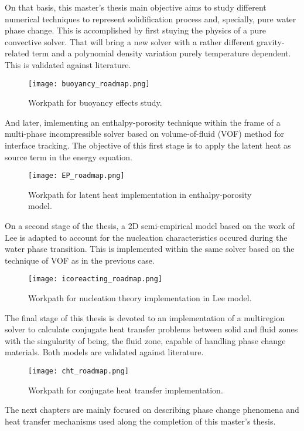 \noindent On that basis, this master's thesis main objective aims to study different numerical techniques to represent solidification process and, specially, pure water phase change. This is accomplished by first stuying the physics of a pure convective solver. That will bring a new solver with a rather different gravity-related term and a polynomial density variation purely temperature dependent. This is validated against literature.
\begin{figure}[h!]
	\centering
	\texttt{[image: buoyancy\_roadmap.png]}
	\caption{Workpath for buoyancy effects study.} 
	\label{1.1fig}
\end{figure}
\clearpage
\noindent And later, imlementing an enthalpy-porosity technique within the frame of a multi-phase incompressible solver based on volume-of-fluid (VOF) method for interface tracking. The objective of this first stage is to apply the latent heat as source term in the energy equation. 
\begin{figure}[h!]
	\centering
	\texttt{[image: EP\_roadmap.png]}
	\caption{Workpath for latent heat implementation in enthalpy-porosity model.} 
	\label{1.2fig}
\end{figure}
\newline
On a second stage of the thesis, a 2D semi-empirical model based on the work of Lee is adapted to account for the nucleation characteristics occured during the water phase transition. This is implemented within the same solver based on the technique of VOF as in the previous case.
\begin{figure}[h!]
	\centering
	\texttt{[image: icoreacting\_roadmap.png]}
	\caption{Workpath for nucleation theory implementation in Lee model.} 
	\label{1.3fig}
\end{figure}
\newline
\noindent The final stage of this thesis is devoted to an implementation of a multiregion solver to calculate conjugate heat transfer problems between solid and fluid zones with the singularity of being, the fluid zone, capable of handling phase change materials. Both models are validated against literature.
\clearpage
\begin{figure}[h!]
	\centering
	\texttt{[image: cht\_roadmap.png]}
	\caption{Workpath for conjugate heat transfer implementation.} 
	\label{1.4fig}
\end{figure}

\noindent The next chapters are mainly focused on describing phase change phenomena and heat transfer mechanisms used along the completion of this master's thesis.


